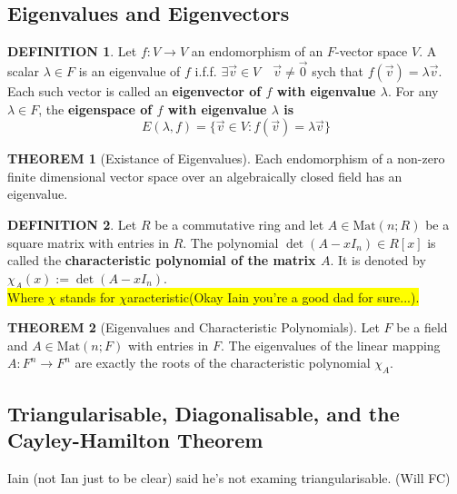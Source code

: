\documentclass[10pt]{article}
\theoremstyle{definition}
\newtheorem{definition}{DEFINITION}[subsection]
\newtheorem{theorem}{THEOREM}[subsection]
\newcommand{\Mat}{\text{Mat}}
\begin{document}
\subsection{Eigenvalues and Eigenvectors}
\begin{definition}
    Let $f:V \rightarrow V$ an endomorphism of an $F$-vector space $V$. A scalar $\lambda \in F$ is an eigenvalue of $f$ i.f.f. $\exists \vec{v} \in V \quad \vec{v} \neq \vec{0}$ sych that $f(\vec{v}) = \lambda\vec{v}$. Each such vector is called an \textbf{eigenvector of $f$ with eigenvalue $\lambda$}. For any $\lambda \in F$, the \textbf{eigenspace of $f$ with eigenvalue $\lambda$ is}    $$E(\lambda,f) = \{\vec{v}\in V:f(\vec{v}) = \lambda\vec{v}\}$$
\end{definition}

\begin{theorem}[Existance of Eigenvalues]
    Each endomorphism of a non-zero finite dimensional vector space over an algebraically closed field has an eigenvalue.
\end{theorem}

\begin{definition}
    Let $R$ be a commutative ring and let $A \in \Mat(n;R)$ be a square matrix with entries in $R$. The polynomial $\det(A-xI_n) \in R[x]$ is called the \textbf{characteristic polynomial of the matrix $A$}. It is denoted by $\chi_A(x):= \det(A-xI_n)$.\\\colorbox{yellow}{Where $\chi$ stands for $\chi$aracteristic\tiny{(Okay Iain you're a good dad for sure...)}.}
\end{definition}

\begin{theorem}[Eigenvalues and Characteristic Polynomials]
    Let $F$ be a field and $A \in \Mat(n;F)$ with entries in $F$. The eigenvalues of the linear mapping $A:F^n \rightarrow F^n$ are exactly the roots of the characteristic polynomial $\chi_A$.
\end{theorem}


\subsection{Triangularisable, Diagonalisable, and the Cayley-Hamilton Theorem}
Iain (not Ian just to be clear) said he's not examing triangularisable. (Will FC)
\end{document}
